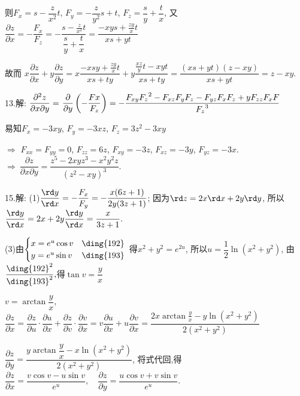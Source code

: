   则$ {F_x} = s - \dfrac{z}{{{x^2}}}t$,
  $F{_y} =  - \dfrac{z}{{{y^2}}}s + t$,
  ${F_z} = \dfrac{s}{y} + \dfrac{t}{x}$,
  又$\dfrac{{\partial z}}{{\partial x}}
  =  - \dfrac{{{F_x}}}{{{F_z}}}
  =  - \dfrac{{s - \frac{z}{{{x^2}}}t}}{{\dfrac{s}{y} + \dfrac{t}{x}}}
  = \dfrac{{ - xys + \frac{{zy}}{x}t}}{{xs + yt}}$

  故而
  $ x\dfrac{{\partial z}}{{\partial x}} + y\dfrac{{\partial z}}{{\partial y}}
  = x\dfrac{{ - xsy + \frac{{zy}}{x}t}}{{xs + ty}} + y\dfrac{{\frac{{xz}}{y}t - xyt}}{{xs + ty}}
  = \dfrac{{\left( {xs + yt} \right)\left( {z - xy} \right)}}{{xs + yt}}
  = z - xy$.

  13.解: $ \dfrac{{{\partial ^2}z}}{{\partial x\partial y}} = {\kern 1pt} \dfrac{\partial }{{\partial y}}\left( { - \dfrac{{Fx}}{{{F_z}}}} \right) =  - \dfrac{{{F_{xy}}{F_{{z}}}^2 - {F_{xz}}{F_y}{F_z} - {F_{yz}}{F_x}{F_z} + y{F_{zz}}{F_x}{F_{}}}}{{{F_z}^3}}$

  易知$ {F_x} =  - 3xy$,
  ${F_y} =  - 3xz$,
  ${F_z} = 3{z^2} - 3xy$

  $\Rightarrow$
  ${F_{xx}} = {F_{yy}} = 0$,
  ${F_{zz}} = 6z$,
  ${F_{xy}} =  - 3z$,
  ${F_{xz}} =  - 3y$,
  ${F_{yz}} =  - 3x. $
  $\Rightarrow~\dfrac{{\partial z}}{{\partial x\partial y}} = \dfrac{{{z^5} - 2xy{z^3} - {x^2}{y^2}z}}{{{{({z^2} - xy)}^3}}}. $

  15.解: (1)$ \dfrac{{\rd y}}{{\rd x}} =  - \dfrac{{{F_x}}}{{{F_y}}} =  - \dfrac{{x(6z + 1)}}{{2y(3z + 1)}}$;
  因为$\rd z = 2x\rd x + 2y\rd y$,
  所以$\dfrac{{\rd y}}{{\rd x}} = 2x + 2y\dfrac{{\rd y}}{{\rd x}} = \dfrac{x}{{3z + 1}}.$

  (3)由$\begin{cases}
  x = {e^u}\cos v & \ding{192}\\
  y = {e^u}\sin v & \ding{193}
  \end{cases}$
  得${x^2} + {y^2} = {e^{2u}}$,
  所以$ u = \dfrac{1}{2}\ln \left( {{x^2} + {y^2}} \right)$,
  由$\dfrac{{{\text{\ding{192}}^2}}}{{{\text{\ding{193}}^2}}},$得$\tan v = \dfrac{y}{x}$

  $v = \arctan \dfrac{y}{x}$,
  $\dfrac{{\partial z}}{{\partial x}}
  = \dfrac{{\partial z}}{{\partial u}} \cdot \dfrac{{\partial u}}{{\partial x}} + \dfrac{{\partial z}}{{\partial v}} \cdot \dfrac{{\partial v}}{{\partial x}}
  = v\dfrac{{\partial u}}{{\partial x}} + u\dfrac{{\partial v}}{{\partial x}}
  = \dfrac{{2x\arctan \frac{y}{x} - y\ln \left( {{x^2} + {y^2}} \right)}}{{2\left( {{x^2} + {y^2}} \right)}}$

  $\dfrac{{\partial z}}{{\partial y}} = \dfrac{{y\arctan \dfrac{y}{x} - x\ln \left( {{x^2} + {y^2}} \right)}}{{2\left( {{x^2} + {y^2}} \right)}}$,
  将式代回,得
  $\dfrac{{\partial z}}{{\partial x}} = \dfrac{{v\cos v - u\sin v}}{{{e^u}}}, \quad
  \dfrac{{\partial z}}{{\partial y}} = \dfrac{{u\cos v + v\sin v}}{{{e^u}}}$.

